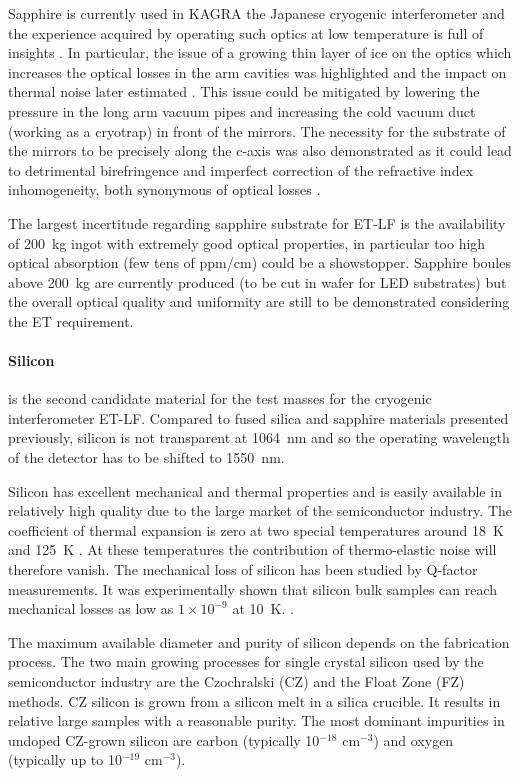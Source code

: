 Sapphire is currently used in KAGRA the Japanese cryogenic interferometer and the experience acquired by operating such optics at low temperature is full of insights \cite{Akutsu_2019}. In particular, the issue of a growing thin layer of ice on the optics which increases the optical losses in the arm cavities was highlighted \cite{hasegawa2019snow} and the impact on thermal noise later estimated \cite{PhysRevResearch.1.013008}. This issue could be mitigated by lowering the pressure in the long arm vacuum pipes and increasing the cold vacuum duct (working as a cryotrap) in front of the mirrors. The necessity for the substrate of the mirrors to be precisely along the c-axis was also demonstrated as it could lead to detrimental birefringence and imperfect correction of the refractive index inhomogeneity, both synonymous of optical losses \cite{somiya2019birefringence}. 

The largest incertitude regarding sapphire substrate for ET-LF is the availability of 200~kg ingot with extremely good optical properties, in particular too high optical absorption (few tens of ppm/cm) could be a showstopper. Sapphire boules above 200~kg are currently produced (to be cut in wafer for LED substrates) \cite{Bigspapphire2019} but the overall optical quality and uniformity are still to be demonstrated considering the ET requirement.\\

\paragraph{Silicon} is the second candidate material for the test masses for the cryogenic interferometer ET-LF. Compared to fused silica and sapphire materials presented previously, silicon is not transparent at 1064~nm and so the operating wavelength of the detector has to be shifted to 1550~nm. 

Silicon has excellent mechanical and thermal properties and is easily available in relatively high quality due to the large market of the semiconductor industry. The coefficient of thermal expansion is zero at two special temperatures around 18~K and 125~K \cite{lyon1977siliconexpansion}. At these temperatures the contribution of thermo-elastic noise will therefore vanish. The mechanical loss of silicon has been studied by Q-factor measurements. It was experimentally shown that silicon bulk samples can reach mechanical losses as low as $1 \times 10^{-9}$ at 10~K. \cite{mcguigan1978siliconQ}.

The maximum available diameter and purity of silicon depends on the fabrication process. The two main growing processes for single crystal silicon used by the semiconductor industry are the Czochralski (CZ) and the Float Zone (FZ) methods. CZ silicon is grown from a silicon melt in a silica crucible. It results in
relative large samples with a reasonable purity. The most dominant impurities in undoped CZ-grown silicon are carbon (typically 10$^{-18}$ cm$^{-3}$) and oxygen (typically up to 10$^{-19}$ cm$^{-3}$). 

